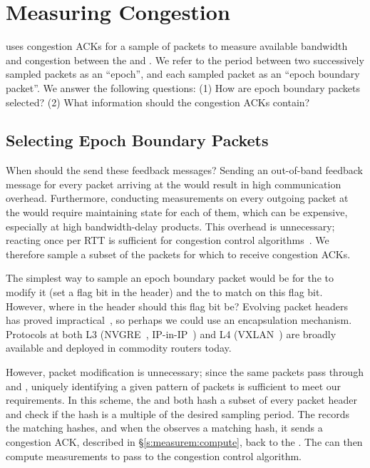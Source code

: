 \section{Measuring Congestion}\label{s:measurement}

\name uses congestion ACKs for a sample of packets to measure available bandwidth and congestion between the \inbox and \outbox. 
We refer to the period between two successively sampled packets as an ``epoch'', and each sampled packet as an ``epoch boundary packet''.
We answer the following questions: (1) How are epoch boundary packets selected? (2) What information should the congestion ACKs contain?

\subsection{Selecting Epoch Boundary Packets}
\label{s:measure:marking}

When should the \outbox send these feedback messages? 
Sending an out-of-band feedback message for every packet arriving at the \outbox would result in high communication overhead. 
Furthermore, conducting measurements on every outgoing packet at the \inbox would require maintaining state for each of them, which can be expensive, especially at high bandwidth-delay products. 
This overhead is unnecessary; reacting once per RTT is sufficient for congestion control algorithms~\cite{ccp}. 
We therefore sample a subset of the packets for which to receive congestion ACKs.

The simplest way to sample an epoch boundary packet would be for the \inbox to modify it (\ie set a flag bit in the header) and the \outbox to match on this flag bit.
However, where in the header should this flag bit be?
Evolving packet headers has proved impractical~\cite{trotsky}, so perhaps we could use an encapsulation mechanism.
Protocols at both L3 (\eg NVGRE~\cite{nvgre}, IP-in-IP~\cite{ipinip}) and L4 (\eg VXLAN~\cite{vxlan}) are broadly available and deployed in commodity routers today.

However, packet modification is unnecessary; since the same packets pass through \inbox and \outbox, uniquely identifying a given pattern of packets is sufficient to meet our requirements. In this scheme, the \inbox and \outbox both hash a subset of every packet header and check if the hash is a multiple of the desired sampling period. 
The \inbox records the matching hashes, and when the \outbox observes a matching hash, it sends a congestion ACK, described in \S\ref{s:measurem:compute}, back to the \inbox. The \inbox can then compute measurements to pass to the congestion control algorithm.

